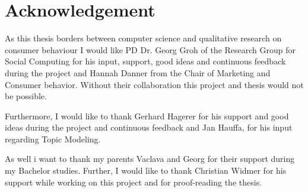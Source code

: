 %
\chapter*{Acknowledgement}
\label{sec:acknowledgement}
\vspace*{-10mm}

As this thesis borders between computer science and qualitative research on consumer behaviour I would like PD Dr. Georg Groh of the Research Group for Social Computing for his input, support, good ideas and continuous feedback during the project and Hannah Danner from the Chair of Marketing and Consumer behavior. Without their collaboration this project and thesis would not be possible. 

Furthermore, I would like to thank Gerhard Hagerer for his support and good ideas during the project and continuous feedback and Jan Hauffa, for his input regarding Topic Modeling.


As well i want to thank my parents Vaclava and Georg for their support during my Bachelor studies. Further, I would like to thank Christian Widmer for his support while working on this project and for proof-reading the thesis. 

\newpage